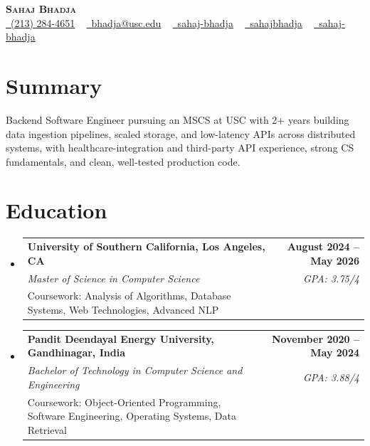 \documentclass[letterpaper,10pt]{article}
\makeatletter
\newcommand{\resumeEduSubheading}[5]{\vspace{-1pt}\item\begin{tabular*}{1.0\textwidth}[t]{l@{\extracolsep{\fill}}r}\textbf{#1} & \textbf{\small #2} \\\textit{\small #3} & \textit{\small #4} \\\small #5 & \\\end{tabular*}\vspace{-4pt}}
\newcommand{\resumeSubHeadingListStart}{\begin{itemize}[leftmargin=0.0in, label={}]}
\newcommand{\resumeSubHeadingListEnd}{\end{itemize}}
\makeatother
\begin{document}
\begin{center}
{\Huge \scshape \textbf{Sahaj Bhadja}} \\ \vspace{1pt}
\small \href{tel:(213) 284-4651}{\faPhone\ \underline{(213) 284-4651}} ~ \href{mailto: bhadja@usc.edu}{\raisebox{-0.2\height}\faEnvelope\ \underline{bhadja@usc.edu}} ~
\href{https://www.linkedin.com/in/sahaj-bhadja/}{\raisebox{-0.2\height}\faLinkedin\ \underline{sahaj-bhadja}} ~ \href{https://github.com/SAHAJ-BHADJA}{\raisebox{-0.2\height}\faGithub\ \underline{sahajbhadja}} ~
\href{https://sahaj-bhadja.vercel.app/}{\raisebox{-0.2\height}\faGlobe\ \underline{sahaj-bhadja}}
\end{center}
\vspace{-16pt}
\section{Summary}
\begin{itemize}[leftmargin=0.15in, label={}]
\small{\item{Backend Software Engineer pursuing an MSCS at USC with 2+ years building data ingestion pipelines, scaled storage, and low-latency APIs across distributed systems, with healthcare-integration and third-party API experience, strong CS fundamentals, and clean, well-tested production code.}}
\end{itemize}
\vspace{-6pt}
\section{Education}
\resumeSubHeadingListStart
\resumeEduSubheading{University of Southern California, Los Angeles, CA}{August 2024 -- May 2026}{Master of Science in Computer Science}{GPA: 3.75/4}{Coursework: Analysis of Algorithms, Database Systems, Web Technologies, Advanced NLP}
\vspace{-9pt}
\resumeEduSubheading{Pandit Deendayal Energy University, Gandhinagar, India}{November 2020 -- May 2024}{Bachelor of Technology in Computer Science and Engineering}{GPA: 3.88/4}{Coursework: Object-Oriented Programming, Software Engineering, Operating Systems, Data Retrieval}
\resumeSubHeadingListEnd
\vspace{-6pt}
\end{document}
